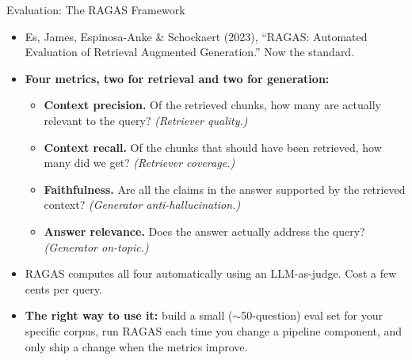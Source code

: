 \documentclass[10pt,english,aspectratio=169]{beamer}
\begin{document}
\begin{frame}{Evaluation: The RAGAS Framework}
\begin{itemize}
\item Es, James, Espinosa-Anke \& Schockaert (2023), ``RAGAS: Automated Evaluation of Retrieval Augmented Generation.'' Now the standard.

\medskip
\item \textbf{Four metrics, two for retrieval and two for generation:}
\begin{itemize}
    \item \textbf{Context precision.} Of the retrieved chunks, how many are actually relevant to the query? \emph{(Retriever quality.)}
    \medskip
    \item \textbf{Context recall.} Of the chunks that should have been retrieved, how many did we get? \emph{(Retriever coverage.)}
    \medskip
    \item \textbf{Faithfulness.} Are all the claims in the answer supported by the retrieved context? \emph{(Generator anti-hallucination.)}
    \medskip
    \item \textbf{Answer relevance.} Does the answer actually address the query? \emph{(Generator on-topic.)}
\end{itemize}

\medskip
\item RAGAS computes all four automatically using an LLM-as-judge. Cost a few cents per query.

\medskip
\item \textbf{The right way to use it:} build a small ($\sim$50-question) eval set for your specific corpus, run RAGAS each time you change a pipeline component, and only ship a change when the metrics improve.
\end{itemize}
\end{frame}
\end{document}
